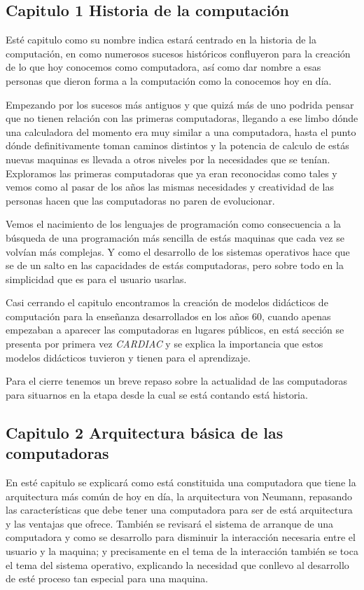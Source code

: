 \documentclass[letterpaper,12pt,oneside]{article}
\begin{document}
		
		
		\subsection{Capitulo 1 Historia de la computación}
			Esté capitulo como su nombre indica estará centrado en la historia de la computación, en como
			numerosos sucesos históricos confluyeron para la creación de lo que hoy conocemos como computadora, así
			como dar nombre a esas personas que dieron forma a la computación como la conocemos hoy en día.
			
			Empezando por los sucesos más antiguos y que quizá más de uno podrida pensar que no tienen relación con las
			primeras computadoras, llegando a ese limbo dónde una calculadora del momento era muy similar
			a una computadora, hasta el punto dónde definitivamente toman caminos distintos y la potencia de calculo
			de estás nuevas maquinas es llevada a otros niveles por la necesidades que se tenían. Exploramos las primeras
			computadoras que ya eran reconocidas como tales y vemos como al pasar de los años las mismas necesidades y
			creatividad de las personas hacen que las computadoras no paren de evolucionar.
			
			Vemos el nacimiento de los lenguajes de programación como consecuencia a la búsqueda de una programación
			más sencilla de estás maquinas que cada vez se volvían más complejas. Y como el desarrollo de los sistemas
			operativos hace que se de un salto en las capacidades de estás computadoras, pero sobre todo
			en la simplicidad que es para el usuario usarlas.
			
			Casi cerrando el capitulo encontramos la creación de modelos didácticos de computación para la enseñanza desarrollados
			en los años 60, cuando apenas empezaban a aparecer las computadoras en lugares públicos, en está sección se presenta por primera
			vez \textit{CARDIAC} y se explica la importancia que estos modelos didácticos tuvieron y tienen para el aprendizaje.
			
			Para el cierre tenemos un breve repaso sobre la actualidad de las computadoras para situarnos en la etapa
			desde la cual se está contando está historia.
			
		\subsection{Capitulo 2 Arquitectura básica de las computadoras}
		
			En esté capitulo se explicará como está constituida una computadora que tiene la arquitectura más común de hoy en día, la
			arquitectura von Neumann, repasando las características que debe tener una computadora para ser de está arquitectura
			y las ventajas que ofrece. También se revisará el sistema de arranque de una computadora y como se desarrollo para disminuir
			la interacción necesaria entre el usuario y la maquina; y precisamente en el tema de la interacción también
			se toca el tema del sistema operativo, explicando la necesidad que conllevo al desarrollo de esté proceso tan especial para una maquina.
			
\end{document}
